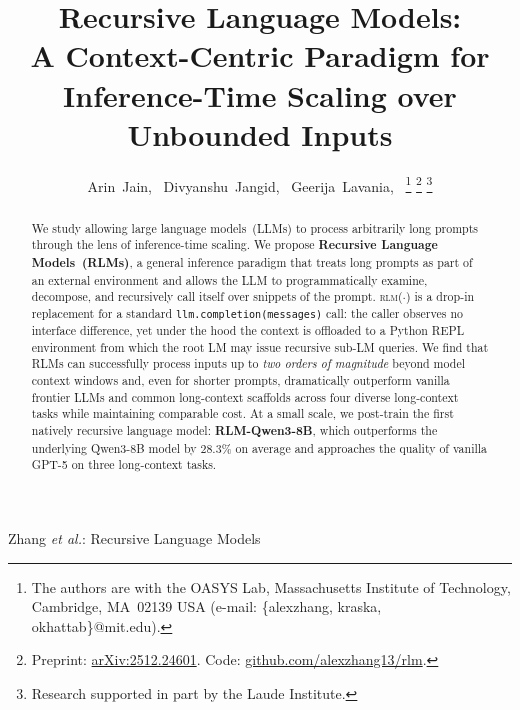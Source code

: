 \documentclass[journal, 10pt, letterpaper]{IEEEtran}
\newcommand{\RLM}[1]{\textsc{rlm}(#1)}
\newcommand{\code}[1]{\texttt{#1}}
\begin{document}
\title{Recursive Language Models:\\
  A Context-Centric Paradigm for\\
  Inference-Time Scaling over Unbounded Inputs}

\author{Arin~Jain,~\IEEEmembership{}
        Divyanshu~Jangid,~\IEEEmembership{}
        Geerija~Lavania,~\IEEEmembership{}
\thanks{The authors are with the OASYS Lab, Massachusetts Institute of Technology,
  Cambridge, MA~02139 USA (e-mail: \{alexzhang, kraska, okhattab\}@mit.edu).}
\thanks{Preprint: \href{https://arxiv.org/abs/2512.24601}{arXiv:2512.24601}.
  Code: \href{https://github.com/alexzhang13/rlm}{github.com/alexzhang13/rlm}.}
\thanks{Research supported in part by the Laude Institute.}
}

{Zhang \MakeLowercase{\textit{et al.}}: Recursive Language Models}

\maketitle

\begin{abstract}
We study allowing large language models~(LLMs) to process arbitrarily long
prompts through the lens of inference-time scaling. We propose
\textbf{Recursive Language Models~(RLMs)}, a general inference paradigm that
treats long prompts as part of an external environment and allows the LLM to
programmatically examine, decompose, and recursively call itself over snippets
of the prompt.  \RLM{$\cdot$} is a drop-in replacement for a standard
\code{llm.completion(messages)} call: the caller observes no interface
difference, yet under the hood the context is offloaded to a Python REPL
environment from which the root LM may issue recursive sub-LM queries.  We
find that RLMs can successfully process inputs up to \emph{two orders of
magnitude} beyond model context windows and, even for shorter prompts,
dramatically outperform vanilla frontier LLMs and common long-context
scaffolds across four diverse long-context tasks while maintaining comparable
cost.  At a small scale, we post-train the first natively recursive language
model: \textbf{RLM-Qwen3-8B}, which outperforms the underlying Qwen3-8B
model by $28.3\%$ on average and approaches the quality of vanilla GPT-5 on
three long-context tasks.
\end{abstract}
\end{document}
